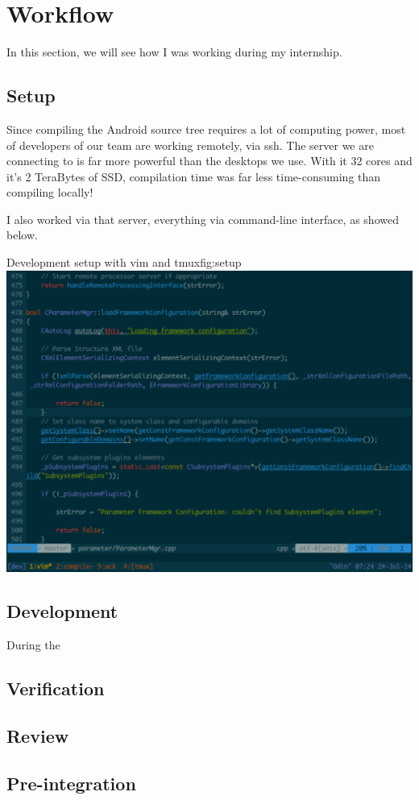 \section{Workflow}
In this section, we will see how I was working during my internship.

\subsection{Setup}
Since compiling the Android source tree requires a lot of computing power,
most of developers of our team are working remotely, via ssh.
The server we are connecting to is far more powerful than the desktops we use.
With it 32 cores and it's 2 TeraBytes of SSD, compilation time was far less time-consuming
than compiling locally!

I also worked via that server, everything via command-line interface, as showed below.
\begin{figureGraphics}{Development setup with vim and tmux}{fig:setup}
\includegraphics[width=\textwidth]{./src/img/setup.pdf}
\end{figureGraphics}

\subsection{Development}
During the
\subsection{Verification}
\subsection{Review}
\subsection{Pre-integration}
